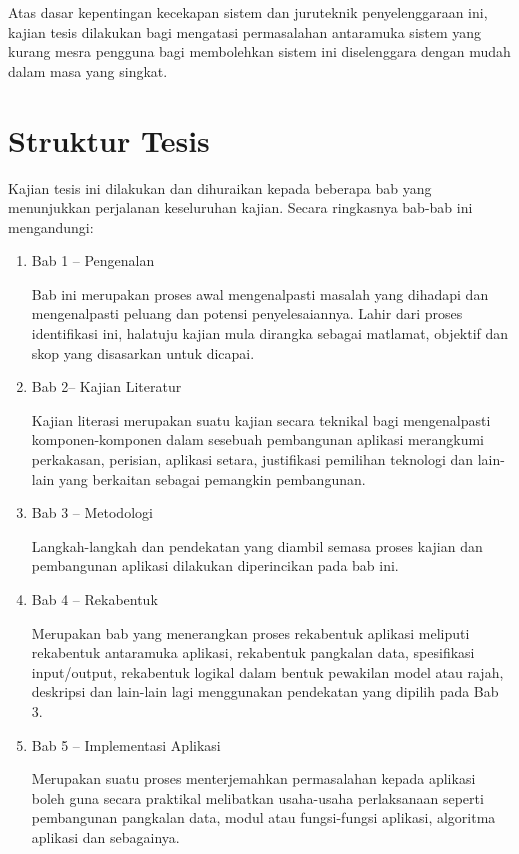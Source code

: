 Atas dasar kepentingan kecekapan sistem dan juruteknik penyelenggaraan ini, kajian tesis dilakukan bagi mengatasi permasalahan antaramuka sistem yang kurang mesra pengguna bagi membolehkan sistem ini diselenggara dengan mudah dalam masa yang singkat.

\section{Struktur Tesis}
Kajian tesis ini dilakukan dan dihuraikan kepada beberapa bab yang menunjukkan perjalanan keseluruhan kajian. Secara ringkasnya bab-bab ini mengandungi:
\bgroup
\renewcommand\theenumi{\roman{enumi}}

\begin{enumerate}
\item Bab 1 – Pengenalan

Bab ini merupakan proses awal mengenalpasti masalah yang dihadapi dan mengenalpasti peluang dan potensi penyelesaiannya. Lahir dari proses identifikasi ini, halatuju kajian mula dirangka sebagai matlamat, objektif dan skop yang disasarkan untuk dicapai.

\item Bab 2– Kajian Literatur

Kajian literasi merupakan suatu kajian secara teknikal bagi mengenalpasti komponen-komponen dalam sesebuah pembangunan aplikasi merangkumi perkakasan, perisian, aplikasi setara, justifikasi pemilihan teknologi dan lain-lain yang berkaitan sebagai pemangkin pembangunan.

\item Bab 3 – Metodologi

Langkah-langkah dan pendekatan yang diambil semasa proses kajian dan pembangunan aplikasi dilakukan diperincikan pada bab ini.

\item Bab 4 – Rekabentuk

Merupakan bab yang menerangkan proses rekabentuk aplikasi meliputi rekabentuk antaramuka aplikasi, rekabentuk pangkalan data, spesifikasi input/output, rekabentuk logikal dalam bentuk pewakilan model atau rajah, deskripsi dan lain-lain lagi menggunakan pendekatan yang dipilih pada Bab 3.

\item Bab 5 –  Implementasi Aplikasi

Merupakan suatu proses menterjemahkan permasalahan kepada aplikasi boleh guna secara praktikal melibatkan usaha-usaha perlaksanaan seperti pembangunan pangkalan data, modul atau fungsi-fungsi aplikasi, algoritma aplikasi dan sebagainya.


\end{enumerate}
